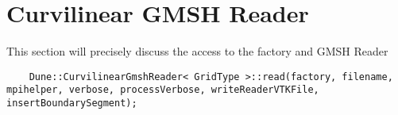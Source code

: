 \section{Curvilinear GMSH Reader}
\label{interface-gmsh-reader}

This section will precisely discuss the access to the factory and GMSH Reader

\begin{mybox}
\begin{lstlisting}
    Dune::CurvilinearGmshReader< GridType >::read(factory, filename, mpihelper, verbose, processVerbose, writeReaderVTKFile, insertBoundarySegment); 
\end{lstlisting}
\end{mybox}